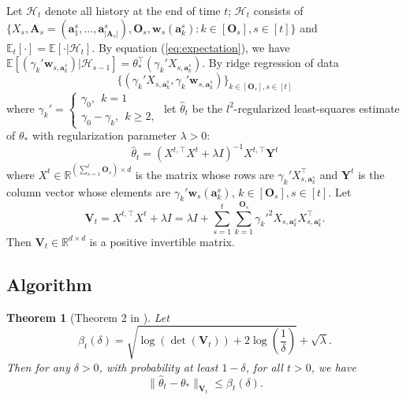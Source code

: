 \documentclass{article}
\newcommand{\bA}{\mathbf{A}}
\newcommand{\ba}{\mathbf{a}}
\newcommand{\bO}{\mathbf{O}}
\newcommand{\bV}{\mathbf{V}}
\newcommand{\bw}{\mathbf{w}}
\newcommand{\bY}{\mathbf{Y}}
\newcommand{\cH}{\mathcal{H}}
\newcommand{\EE}{\mathbb{E}}
\newcommand{\RR}{\mathbb{R}}
\newcommand{\abs}[1]{\left| #1 \right|}
\newcommand{\norm}[1]{\| #1 \|}
\newtheorem{theorem}{Theorem}[section]
\begin{document}
Let $\cH_t$ denote all history at the end of time $t$; $\cH_t$ consists of $\{X_s, \bA_s=(\ba_{1}^s,...,\ba_{\abs{\bA_s}}^s), \bO_s, \bw_s(\ba_k^s): k \in[\bO_s], s\in[t] \}$ and $\EE_t[\cdot] = \EE[\cdot | \cH_t]$. By equation (\ref{eq:expectation}), we have $\EE[(\gamma_k'\bw_{s,\ba_k^s}) | \cH_{s-1}] = \theta_*^{\top} (\gamma_k' X_{s,\ba_k^s})$. By ridge regression of data 
$$
\{(\gamma_k' X_{s,\ba_k^s}, \gamma_k'\bw_{s,\ba_k^s})\}_{k \in[\bO_s], s\in[t]}
$$
where $\gamma_k' = \begin{cases}
\gamma_0, ~~k=1\\
\gamma_0-\gamma_k, ~~k\geq 2,
\end{cases}$
let $\hat{\theta}_t$ be the $l^2$-regularized least-squares estimate of $\theta_*$ with regularization parameter $\lambda > 0$:
\begin{equation}
\hat{\theta}_t = (X^{t,\top}X^{t} + \lambda I)^{-1} X^{t, \top} \bY^t
\end{equation}
where $X^t \in \RR^{(\sum_{s=1}^{t}\bO_s) \times d}$ is the matrix whose rows are $\gamma_k' X_{s,\ba_k^s}^{\top}$ and $\bY^t$ is the column vector whose elements are $\gamma_k' \bw_s(\ba_k^s)$, $k \in[\bO_s], s\in[t]$. Let
$$
\bV_t = X^{t,\top}X^{t} + \lambda I = \lambda I + \sum_{s=1}^{t} \sum_{k=1}^{\bO_s} \gamma_k'^2 X_{s,\ba_k^s}X_{s,\ba_k^s}^{\top}.
$$
Then $\bV_t \in \RR^{d \times d}$ is a positive invertible matrix.


\subsection{Algorithm}
	
\begin{theorem}[Theorem 2 in \cite{abbasi2011improved}]
\label{thm:theta_estimate}
Let 
$$
\beta_{t}(\delta) = \sqrt{\log(\det(\bV_{t})) + 2 \log(\frac{1}{\delta})} + \sqrt{\lambda}.
$$
Then for any $\delta > 0$, with probability at least $1 - \delta$, for all $t > 0$, we have
\begin{equation}
\norm{\hat{\theta}_t - \theta_*}_{\bV_{t}} \leq \beta_{t}(\delta).
\end{equation}
\end{theorem}
	
\end{document}
